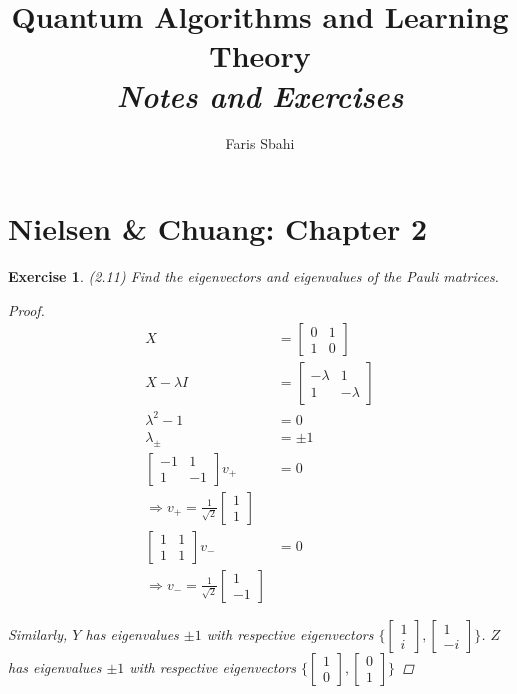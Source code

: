 \documentclass[11pt]{article}
\date{}
\title{Quantum Algorithms and Learning Theory\\\textit{Notes and Exercises}}
\author{Faris Sbahi}
\newcommand\0{\mathbf{0}}
\newcommand\<{\langle}
\renewcommand\>{\rangle}
\renewcommand\implies{\Rightarrow}
\newtheorem{exercise}[theorem]{Exercise}
\begin{document}
\maketitle

\tableofcontents

\section{Nielsen \& Chuang: Chapter 2}

\begin{exercise} (2.11) Find the eigenvectors and eigenvalues of the Pauli matrices. 

\begin{proof}
	\begin{align*}
	X &= \begin{bmatrix}
 0 & 1 \\ 1 & 0	
 \end{bmatrix} \\
 X - \lambda I &= \begin{bmatrix}
 -\lambda & 1 \\ 1 & -\lambda	
 \end{bmatrix} \\
 \lambda^2 - 1 &= 0 \\
 \lambda_{\pm} &= \pm 1 \\
 \begin{bmatrix}
 -1 & 1 \\ 1 & -1
 \end{bmatrix} v_+ &= 0 \\
 \implies v_+ = \frac{1}{\sqrt{2}}\begin{bmatrix}
 1 \\ 1
 \end{bmatrix} \\
 \begin{bmatrix}
 1 & 1 \\ 1 & 1
 \end{bmatrix} v_- &= 0 \\
 \implies v_- = \frac{1}{\sqrt{2}}\begin{bmatrix}
 1 \\ -1
 \end{bmatrix}
	\end{align*}

Similarly, $Y$ has eigenvalues $\pm 1$ with respective eigenvectors $\Big\{ \begin{bmatrix}
 1 \\ i
 \end{bmatrix} , \begin{bmatrix}
 1 \\ -i
 \end{bmatrix} \Big\}$. $Z$ has eigenvalues $\pm 1$ with respective eigenvectors $\Big\{ \begin{bmatrix}
 1 \\ 0
 \end{bmatrix} , \begin{bmatrix}
 0 \\ 1
 \end{bmatrix} \Big\}$
\end{proof}
	
\end{exercise}
\end{document}
